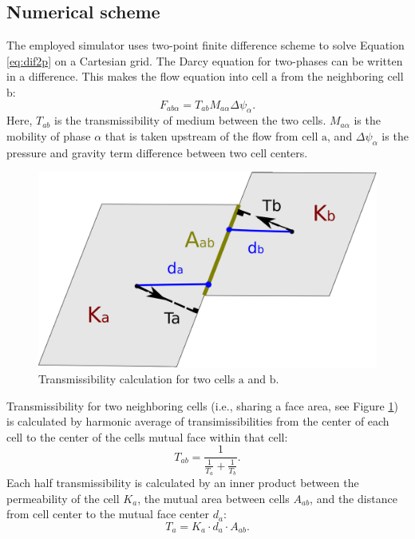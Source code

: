 \subsection{Numerical scheme}

The employed simulator uses two-point finite difference scheme to solve
Equation \ref{eq:dif2p} on a Cartesian grid. The Darcy equation for two-phases
can be written
in a difference. This makes the flow equation into cell $\mbox{a}$ from the
neighboring cell $\mbox{b}$:
\begin{equation}
 F_{ab\alpha}=T_{ab}M_{a\alpha}\Delta \psi_{\alpha}.
\label{eq:eclF}
\end{equation} Here, $T_{ab}$ is the transmissibility of medium between the two
cells. $M_{a\alpha}$ is the mobility of phase $\alpha$ that is taken upstream of
the flow from cell $\mbox{a}$, and $\Delta \psi_{\alpha}$ is the pressure and
gravity term difference between two cell centers. 


\begin{figure}
 \centering{}
 \includegraphics[width=0.4\linewidth]{./figurer/trans.eps}
 \caption{Transmissibility calculation for two cells $\mbox{a}$ and $\mbox{b}$.}
 \label{fig:tran}
\end{figure}

Transmissibility for two neighboring cells (i.e., sharing a face area, see
Figure \ref{fig:tran}) is
calculated by harmonic average of transimissibilities from the center of each
cell to the center of the cells mutual face within that cell:
\begin{equation}
 T_{ab}=\frac{1}{\frac{1}{T_a}+\frac{1}{T_b}}.
 \label{eq:Thav}
\end{equation} Each half transmissibility is calculated by an inner product
between the permeability of the cell $K_a $, the mutual area between cells
$A_{ab}$, and the distance from cell center to the mutual face center $d_a$:
\begin{equation}
  T_a = K_a \cdot d_a \cdot A_{ab}.
  \label{eq:tran}
\end{equation}

